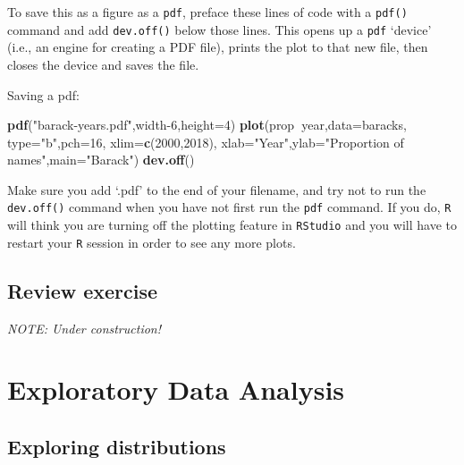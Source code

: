 \documentclass[
]{book}
\newenvironment{Shaded}{\begin{snugshade}}{\end{snugshade}}
\newcommand{\DataTypeTok}[1]{\textcolor[rgb]{0.13,0.29,0.53}{#1}}
\newcommand{\DecValTok}[1]{\textcolor[rgb]{0.00,0.00,0.81}{#1}}
\newcommand{\KeywordTok}[1]{\textcolor[rgb]{0.13,0.29,0.53}{\textbf{#1}}}
\newcommand{\NormalTok}[1]{#1}
\newcommand{\OperatorTok}[1]{\textcolor[rgb]{0.81,0.36,0.00}{\textbf{#1}}}
\newcommand{\StringTok}[1]{\textcolor[rgb]{0.31,0.60,0.02}{#1}}
\begin{document}
To save this as a figure as a \texttt{pdf}, preface these lines of code with a \texttt{pdf()} command and add \texttt{dev.off()} below those lines. This opens up a \texttt{pdf} `device' (i.e., an engine for creating a PDF file), prints the plot to that new file, then closes the device and saves the file.

Saving a pdf:

\begin{Shaded}
\begin{Highlighting}[]
\KeywordTok{pdf}\NormalTok{(}\StringTok{"barack-years.pdf"}\NormalTok{,width}\DecValTok{-6}\NormalTok{,}\DataTypeTok{height=}\DecValTok{4}\NormalTok{)}
\KeywordTok{plot}\NormalTok{(prop}\OperatorTok{~}\NormalTok{year,}\DataTypeTok{data=}\NormalTok{baracks,}
     \DataTypeTok{type=}\StringTok{"b"}\NormalTok{,}\DataTypeTok{pch=}\DecValTok{16}\NormalTok{,}
     \DataTypeTok{xlim=}\KeywordTok{c}\NormalTok{(}\DecValTok{2000}\NormalTok{,}\DecValTok{2018}\NormalTok{),}
     \DataTypeTok{xlab=}\StringTok{"Year"}\NormalTok{,}\DataTypeTok{ylab=}\StringTok{"Proportion of names"}\NormalTok{,}\DataTypeTok{main=}\StringTok{"Barack"}\NormalTok{)}
\KeywordTok{dev.off}\NormalTok{()}
\end{Highlighting}
\end{Shaded}

Make sure you add `.pdf' to the end of your filename, and try not to run the \texttt{dev.off()} command when you have not first run the \texttt{pdf} command. If you do, \texttt{R} will think you are turning off the plotting feature in \texttt{RStudio} and you will have to restart your \texttt{R} session in order to see any more plots.

\hypertarget{review-exercise-2}{%
\section*{Review exercise}\label{review-exercise-2}}

\emph{NOTE: Under construction!}

\hypertarget{exploratory-data-analysis}{%
\chapter{Exploratory Data Analysis}\label{exploratory-data-analysis}}

\hypertarget{exploring-distributions}{%
\section*{Exploring distributions}\label{exploring-distributions}}
\end{document}
